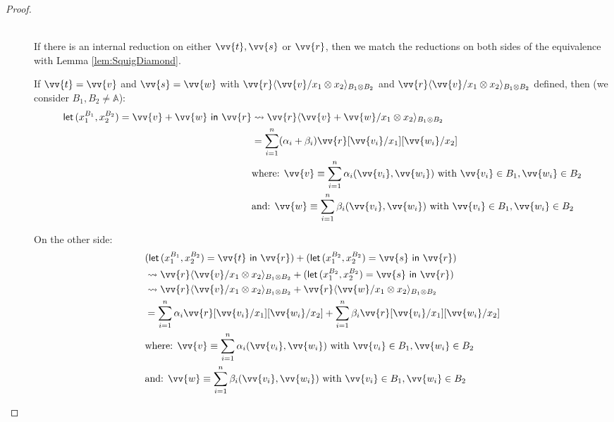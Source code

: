 \documentclass[runningheads,orivec,envcountsame,envcountsect]{llncs}
\newcommand\ansubst[2]{\ensuremath{\langle #1 \rangle_{#2}}}
\newcommand\AbsBasis{\ensuremath{\mathbb{A}}}
\def\Pair#1#2{(#1,#2)} %
\def\letkeyword{\mathsf{let}}
\def\inkeyword{\mathsf{in}}
\def\LetP#1#2#3#4#5#6{\letkeyword\,\Pair{#1^{#2}}{#3^{#4}}=#5~\inkeyword~#6}
\def\lraneq{\rightsquigarrow}
\begin{document}
\begin{proof}
\begin{description}
    \item[\parbox{.75\linewidth}{\begin{align*}
      &\LetP{x_1}{B_1}{x_2}{B_2}{\vv{t}+\vv{s}}{\vv{r}}\equiv\\
      &(\LetP{x_1}{B_1}{x_2}{B_2}{\vv{t}}{\vv{r}}) +
      (\LetP{x_1}{B_2}{x_2}{B_2}{\vv{s}}{\vv{r}})
      \end{align*}}:]\hfill\\
      If there is an internal reduction on either $\vv{t}, \vv{s}$ or $\vv{r}$, then we match the reductions on both sides of the equivalence with Lemma \ref{lem:SquigDiamond}.

      If $\vv{t}=\vv{v}$ and $\vv{s}=\vv{w}$ with $\vv{r}\ansubst{\vv{v}/x_1\otimes x_2}{B_1\otimes B_2}$ and $\vv{r}\ansubst{\vv{v}/x_1\otimes x_2}{B_1\otimes B_2}$ defined, then (we consider $B_1,B_2\neq\AbsBasis$):
      \begin{align*}
      \LetP{x_1}{B_1}{x_2}{B_2}{\vv{v}+\vv{w}}{\vv{r}}&\lraneq\vv{r}\ansubst{\vv{v}+\vv{w}/x_1\otimes x_2}{B_1\otimes B_2}\\
      &=\sum_{i=1}^n (\alpha_i+\beta_i) \vv{r}[\vv{v_i}/x_1][\vv{w_i}/x_2]\\
      &\text{where: }\vv{v}\equiv\sum_{i=1}^n\alpha_i\Pair{\vv{v_i}}{\vv{w_i}} \text{ with } \vv{v_i}\in B_1, \vv{w_i}\in B_2\\
      &\text{and: }\vv{w}\equiv\sum_{i=1}^n\beta_i\Pair{\vv{v_i}}{\vv{w_i}} \text{ with } \vv{v_i}\in B_1, \vv{w_i}\in B_2\\
      \end{align*}

      On the other side:
      \begin{align*}
      &(\LetP{x_1}{B_1}{x_2}{B_2}{\vv{t}}{\vv{r}}) + (\LetP{x_1}{B_2}{x_2}{B_2}{\vv{s}}{\vv{r}})\\
      &\lraneq\vv{r}\ansubst{\vv{v}/x_1\otimes x_2}{B_1\otimes B_2} + (\LetP{x_1}{B_2}{x_2}{B_2}{\vv{s}}{\vv{r}})\\
      &\lraneq\vv{r}\ansubst{\vv{v}/x_1\otimes x_2}{B_1\otimes B_2} + \vv{r}\ansubst{\vv{w}/x_1\otimes x_2}{B_1\otimes B_2}\\
      &=\sum_{i=1}^n\alpha_i\vv{r}[\vv{v_i}/x_1][\vv{w_i}/x_2] + \sum_{i=1}^n \beta_i \vv{r}[\vv{v_i}/x_1][\vv{w_i}/x_2]\\
      &\text{where: }\vv{v}\equiv\sum_{i=1}^n\alpha_i\Pair{\vv{v_i}}{\vv{w_i}} \text{ with } \vv{v_i}\in B_1, \vv{w_i}\in B_2\\
      &\text{and: }\vv{w}\equiv\sum_{i=1}^n\beta_i\Pair{\vv{v_i}}{\vv{w_i}} \text{ with } \vv{v_i}\in B_1, \vv{w_i}\in B_2\\
      \end{align*}
        

\end{description}
\end{proof}
\end{document}
